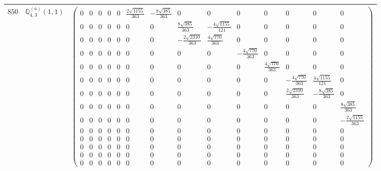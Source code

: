 \documentclass[fleqn,8pt,landscape]{jsarticle}
\begin{document}
\begin{center}
\begin{longtable}{ccc}
$ 850 $ & $ \mathbb{Q}_{4,3}^{(a)}(1,1) $ & $ \begin{pmatrix} 0 & 0 & 0 & 0 & 0 & \frac{2 \sqrt{1155}}{363} & - \frac{8 \sqrt{385}}{363} & 0 & 0 & 0 & 0 & 0 & 0 & 0 \\ 0 & 0 & 0 & 0 & 0 & 0 & 0 & \frac{8 \sqrt{385}}{363} & - \frac{4 \sqrt{1155}}{121} & 0 & 0 & 0 & 0 & 0 \\ 0 & 0 & 0 & 0 & 0 & 0 & 0 & - \frac{2 \sqrt{2310}}{363} & \frac{4 \sqrt{770}}{363} & 0 & 0 & 0 & 0 & 0 \\ 0 & 0 & 0 & 0 & 0 & 0 & 0 & 0 & 0 & - \frac{4 \sqrt{770}}{363} & 0 & 0 & 0 & 0 \\ 0 & 0 & 0 & 0 & 0 & 0 & 0 & 0 & 0 & 0 & \frac{4 \sqrt{770}}{363} & 0 & 0 & 0 \\ 0 & 0 & 0 & 0 & 0 & 0 & 0 & 0 & 0 & 0 & 0 & - \frac{4 \sqrt{770}}{363} & \frac{4 \sqrt{1155}}{121} & 0 \\ 0 & 0 & 0 & 0 & 0 & 0 & 0 & 0 & 0 & 0 & 0 & \frac{2 \sqrt{2310}}{363} & - \frac{8 \sqrt{385}}{363} & 0 \\ 0 & 0 & 0 & 0 & 0 & 0 & 0 & 0 & 0 & 0 & 0 & 0 & 0 & \frac{8 \sqrt{385}}{363} \\ 0 & 0 & 0 & 0 & 0 & 0 & 0 & 0 & 0 & 0 & 0 & 0 & 0 & - \frac{2 \sqrt{1155}}{363} \\ 0 & 0 & 0 & 0 & 0 & 0 & 0 & 0 & 0 & 0 & 0 & 0 & 0 & 0 \\ 0 & 0 & 0 & 0 & 0 & 0 & 0 & 0 & 0 & 0 & 0 & 0 & 0 & 0 \\ 0 & 0 & 0 & 0 & 0 & 0 & 0 & 0 & 0 & 0 & 0 & 0 & 0 & 0 \\ 0 & 0 & 0 & 0 & 0 & 0 & 0 & 0 & 0 & 0 & 0 & 0 & 0 & 0 \\ 0 & 0 & 0 & 0 & 0 & 0 & 0 & 0 & 0 & 0 & 0 & 0 & 0 & 0 \end{pmatrix} $ \\ \hline

\end{longtable}
\end{center}
\end{document}
